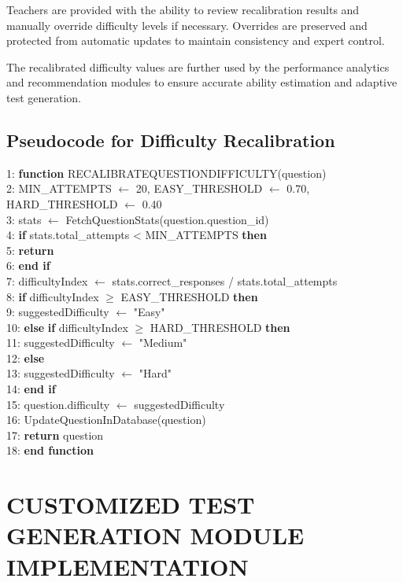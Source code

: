 \begin{sloppypar}
Teachers are provided with the ability to review recalibration results and manually override difficulty levels if necessary. Overrides are preserved and protected from automatic updates to maintain consistency and expert control.

The recalibrated difficulty values are further used by the performance analytics and recommendation modules to ensure accurate ability estimation and adaptive test generation.

\subsection{Pseudocode for Difficulty Recalibration}

1: \textbf{function} RECALIBRATEQUESTIONDIFFICULTY(question)\\
2: \quad MIN\_ATTEMPTS $\leftarrow$ 20, EASY\_THRESHOLD $\leftarrow$ 0.70, HARD\_THRESHOLD $\leftarrow$ 0.40\\
3: \quad stats $\leftarrow$ FetchQuestionStats(question.question\_id)\\
4: \quad \textbf{if} stats.total\_attempts < MIN\_ATTEMPTS \textbf{then}\\
5: \qquad \textbf{return}\\
6: \quad \textbf{end if}\\
7: \quad difficultyIndex $\leftarrow$ stats.correct\_responses / stats.total\_attempts\\
8: \quad \textbf{if} difficultyIndex $\geq$ EASY\_THRESHOLD \textbf{then}\\
9: \qquad suggestedDifficulty $\leftarrow$ "Easy"\\
10: \quad \textbf{else} \textbf{if} difficultyIndex $\geq$ HARD\_THRESHOLD \textbf{then}\\
11: \qquad suggestedDifficulty $\leftarrow$ "Medium"\\
12: \quad \textbf{else}\\
13: \qquad suggestedDifficulty $\leftarrow$ "Hard"\\
14: \quad \textbf{end if}\\
15: \quad question.difficulty $\leftarrow$ suggestedDifficulty\\
16: \quad UpdateQuestionInDatabase(question)\\
17: \quad \textbf{return} question\\
18: \textbf{end function}
\algofooter

\section{\MakeUppercase{CUSTOMIZED TEST GENERATION MODULE IMPLEMENTATION}}


\end{sloppypar}
